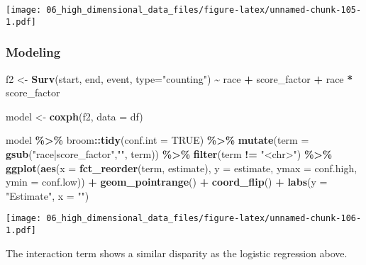 \documentclass[
]{book}
\newenvironment{Shaded}{\begin{snugshade}}{\end{snugshade}}
\newcommand{\DataTypeTok}[1]{\textcolor[rgb]{0.13,0.29,0.53}{#1}}
\newcommand{\KeywordTok}[1]{\textcolor[rgb]{0.13,0.29,0.53}{\textbf{#1}}}
\newcommand{\NormalTok}[1]{#1}
\newcommand{\OperatorTok}[1]{\textcolor[rgb]{0.81,0.36,0.00}{\textbf{#1}}}
\newcommand{\OtherTok}[1]{\textcolor[rgb]{0.56,0.35,0.01}{#1}}
\newcommand{\StringTok}[1]{\textcolor[rgb]{0.31,0.60,0.02}{#1}}
\begin{document}
\texttt{[image: 06\_high\_dimensional\_data\_files/figure-latex/unnamed-chunk-105-1.pdf]}

\hypertarget{modeling-2}{%
\subsubsection{Modeling}\label{modeling-2}}

\begin{Shaded}
\begin{Highlighting}[]
\NormalTok{f2 \textless{}{-}}\StringTok{ }\KeywordTok{Surv}\NormalTok{(start, end, event, }\DataTypeTok{type=}\StringTok{"counting"}\NormalTok{) }\OperatorTok{\textasciitilde{}}\StringTok{ }\NormalTok{race }\OperatorTok{+}\StringTok{ }\NormalTok{score\_factor }\OperatorTok{+}\StringTok{ }\NormalTok{race }\OperatorTok{*}\StringTok{ }\NormalTok{score\_factor}

\NormalTok{model \textless{}{-}}\StringTok{ }\KeywordTok{coxph}\NormalTok{(f2, }\DataTypeTok{data =}\NormalTok{ df)}

\NormalTok{model }\OperatorTok{\%\textgreater{}\%}
\StringTok{  }\NormalTok{broom}\OperatorTok{::}\KeywordTok{tidy}\NormalTok{(}\DataTypeTok{conf.int =} \OtherTok{TRUE}\NormalTok{) }\OperatorTok{\%\textgreater{}\%}
\StringTok{  }\KeywordTok{mutate}\NormalTok{(}\DataTypeTok{term =} \KeywordTok{gsub}\NormalTok{(}\StringTok{"race|score\_factor"}\NormalTok{,}\StringTok{""}\NormalTok{, term)) }\OperatorTok{\%\textgreater{}\%}\StringTok{ }
\StringTok{  }\KeywordTok{filter}\NormalTok{(term }\OperatorTok{!=}\StringTok{ "\textless{}chr\textgreater{}"}\NormalTok{) }\OperatorTok{\%\textgreater{}\%}
\StringTok{  }\KeywordTok{ggplot}\NormalTok{(}\KeywordTok{aes}\NormalTok{(}\DataTypeTok{x =} \KeywordTok{fct\_reorder}\NormalTok{(term, estimate), }\DataTypeTok{y =}\NormalTok{ estimate, }\DataTypeTok{ymax =}\NormalTok{ conf.high, }\DataTypeTok{ymin =}\NormalTok{ conf.low)) }\OperatorTok{+}
\StringTok{  }\KeywordTok{geom\_pointrange}\NormalTok{() }\OperatorTok{+}
\StringTok{  }\KeywordTok{coord\_flip}\NormalTok{() }\OperatorTok{+}
\StringTok{  }\KeywordTok{labs}\NormalTok{(}\DataTypeTok{y =} \StringTok{"Estimate"}\NormalTok{, }\DataTypeTok{x =} \StringTok{""}\NormalTok{)}
\end{Highlighting}
\end{Shaded}

\texttt{[image: 06\_high\_dimensional\_data\_files/figure-latex/unnamed-chunk-106-1.pdf]}

The interaction term shows a similar disparity as the logistic regression above.
\end{document}
